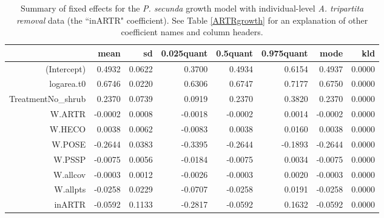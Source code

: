 \documentclass[11pt]{article}
\begin{document}
\begin{table}
\centering
\caption{Summary of fixed effects for the \textit{P. secunda} growth model with individual-level \textit{A. tripartita removal} data (the ``inARTR" coefficient). See Table \ref{ARTRgrowth} for an explanation of other coefficient names and column headers. } 
\label{table:POSEgrowth-inARTR}
\begin{tabular}{rrrrrrrr}
  \hline
 & mean & sd & 0.025quant & 0.5quant & 0.975quant & mode & kld \\ 
  \hline
(Intercept) & 0.4932 & 0.0622 & 0.3700 & 0.4934 & 0.6154 & 0.4937 & 0.0000 \\ 
  logarea.t0 & 0.6746 & 0.0220 & 0.6306 & 0.6747 & 0.7177 & 0.6750 & 0.0000 \\ 
  TreatmentNo\_shrub & 0.2370 & 0.0739 & 0.0919 & 0.2370 & 0.3820 & 0.2370 & 0.0000 \\ 
  W.ARTR & -0.0002 & 0.0008 & -0.0018 & -0.0002 & 0.0014 & -0.0002 & 0.0000 \\ 
  W.HECO & 0.0038 & 0.0062 & -0.0083 & 0.0038 & 0.0160 & 0.0038 & 0.0000 \\ 
  W.POSE & -0.2644 & 0.0383 & -0.3395 & -0.2644 & -0.1893 & -0.2644 & 0.0000 \\ 
  W.PSSP & -0.0075 & 0.0056 & -0.0184 & -0.0075 & 0.0034 & -0.0075 & 0.0000 \\ 
  W.allcov & -0.0003 & 0.0012 & -0.0026 & -0.0003 & 0.0020 & -0.0003 & 0.0000 \\ 
  W.allpts & -0.0258 & 0.0229 & -0.0707 & -0.0258 & 0.0191 & -0.0258 & 0.0000 \\ 
  inARTR & -0.0592 & 0.1133 & -0.2817 & -0.0592 & 0.1632 & -0.0592 & 0.0000 \\ 
   \hline
\end{tabular}
\end{table}
\end{document}
